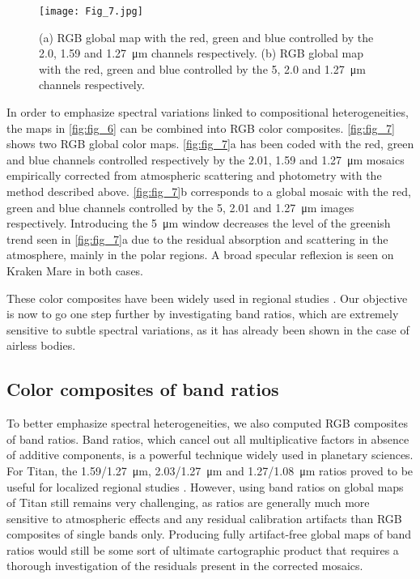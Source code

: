 \documentclass[preprint,twocolumn,5p,authoryear,compress,colorlinks=true]{elsarticle}
\newcommand{\figref}[1]{\autoref{fig:#1}}
\begin{document}
{\begin{figure}[!ht]
 \texttt{[image: Fig\_7.jpg]}
 \caption{(a) RGB global map with the red, green and blue controlled by the \num{2.0}, \num{1.59} and \SI{1.27}{\um} channels respectively. (b) RGB global map with the red, green and blue controlled by the \num{5}, \num{2.0} and \SI{1.27}{\um} channels respectively.}
 \label{fig:fig_7}
\end{figure}

In order to emphasize spectral variations linked to compositional heterogeneities, the maps in \figref{fig_6} can be combined into RGB color composites. \figref{fig_7} shows two RGB global color maps. \figref{fig_7}a has been coded with the red, green and blue channels controlled respectively by the \num{2.01}, \num{1.59} and \SI{1.27}{\um} mosaics empirically corrected from atmospheric scattering and photometry with the method described above. \figref{fig_7}b corresponds to a global mosaic with the red, green and blue channels controlled by the \num{5}, \num{2.01} and \SI{1.27}{\um} images respectively. Introducing the \SI{5}{\um} window decreases the level of the greenish trend seen in \figref{fig_7}a due to the residual absorption and scattering in the atmosphere, mainly in the polar regions. A broad specular reflexion is seen on Kraken Mare in both cases.

These color composites have been widely used in regional studies \citep[\emph{e.g.,}][]{Barnes2007, Barnes2011, Soderblom2009b, Soderblom2009a, Cornet2012, Rodriguez2014}. Our objective is now to go one step further by investigating band ratios, which are extremely sensitive to subtle spectral variations, as it has already been shown in the case of airless bodies.

\subsection{Color composites of band ratios}

To better emphasize spectral heterogeneities, we also computed RGB composites of band ratios. Band ratios, which cancel out all multiplicative factors in absence of additive components, is a powerful technique widely used in planetary sciences. For Titan, the \SI{1.59/1.27}{\um}, \SI{2.03/1.27}{\um} and \SI{1.27/1.08}{\um} ratios proved to be useful for localized regional studies \citep{LeMouelic2008, Brossier2018}. However, using band ratios on global maps of Titan still remains very challenging, as ratios are generally much more sensitive to atmospheric effects and any residual calibration artifacts than RGB composites of single bands only. Producing fully artifact-free global maps of band ratios would still be some sort of ultimate cartographic product that requires a thorough investigation of the residuals present in the corrected mosaics. 

}
\end{document}
